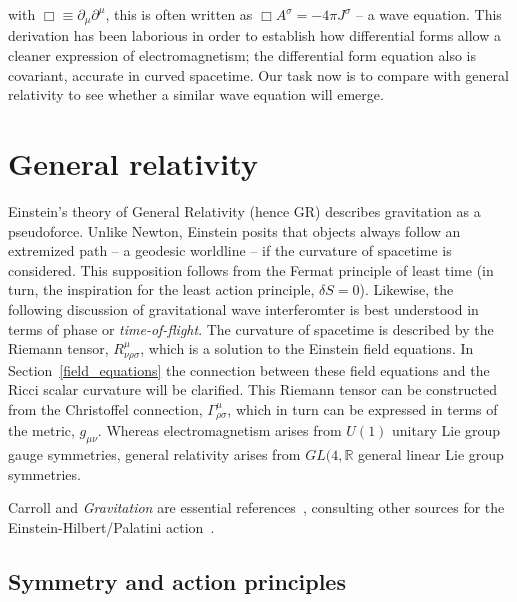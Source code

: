 \noindent with $\Box \equiv \partial_\mu \partial^\mu$, this is often written as $\Box A^\sigma = -4 \pi J^\sigma$ -- a wave equation. 
This derivation has been laborious in order to establish how differential forms allow a cleaner expression of electromagnetism; the differential form equation also is covariant, accurate in curved spacetime.
Our task now is to compare with general relativity to see whether a similar wave equation will emerge.

    \section{General relativity}
    \label{general_relativity}

        Einstein's theory of General Relativity (hence GR) describes gravitation as a pseudoforce. 
Unlike Newton, Einstein posits that objects always follow an extremized path -- a geodesic worldline -- if the curvature of spacetime is considered. 
This supposition follows from the Fermat principle of least time (in turn, the inspiration for the least action principle, $\delta S = 0$).
Likewise, the following discussion of gravitational wave interferomter is best understood in terms of phase or \textit{time-of-flight}.
The curvature of spacetime is described by the Riemann tensor, $R^\mu_{\nu\rho\sigma}$, which is a solution to the Einstein field equations. 
In Section~\ref{field_equations} the connection between these field equations and the Ricci scalar curvature will be clarified. 
This Riemann tensor can be constructed from the Christoffel connection, $\Gamma^\mu_{\rho\sigma}$, which in turn can be expressed in terms of the metric, $g_{\mu \nu}$.
Whereas electromagnetism arises from $U(1)$ unitary Lie group gauge symmetries, general relativity arises from $GL(4, \mathbb{R}$ general linear Lie group symmetries.

 Carroll and \textit{Gravitation} are essential references~\cite{Carroll1997,MisnerThorneWheeler}, consulting other sources for the Einstein-Hilbert/Palatini action~\cite{FarrThesis}.


        \subsection{Symmetry and action principles}
        \label{principles}


